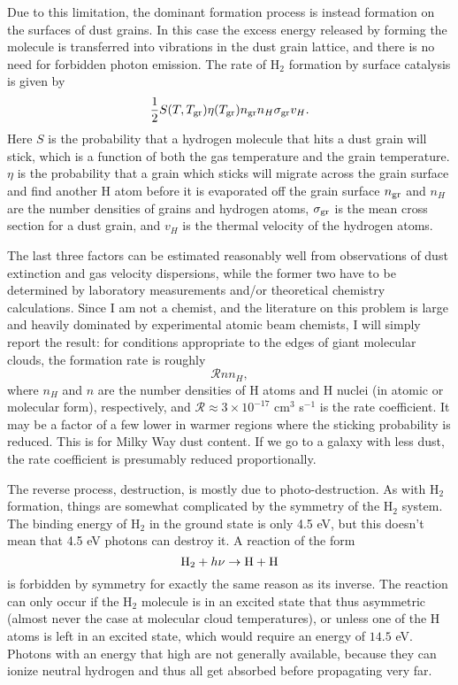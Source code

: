 Due to this limitation, the dominant formation process is instead formation on the surfaces of dust grains. In this case the excess energy released by forming the molecule is transferred into vibrations in the dust grain lattice, and there is no need for forbidden photon emission. The rate of H$_2$ formation by surface catalysis is given by
\begin{equation}
\frac{1}{2} S(T,T_{\rm gr}) \eta(T_{\rm gr}) n_{\rm gr} n_H \sigma_{\rm gr} v_H.
\end{equation}
Here $S$ is the probability that a hydrogen molecule that hits a dust grain will stick, which is a function of both the gas temperature and the grain temperature. $\eta$ is the probability that a grain which sticks will migrate across the grain surface and find another H atom before it is evaporated off the grain surface $n_{\rm gr}$ and $n_H$ are the number densities of grains and hydrogen atoms, $\sigma_{\rm gr}$ is the mean cross section for a dust grain, and $v_H$ is the thermal velocity of the hydrogen atoms.

The last three factors can be estimated reasonably well from observations of dust extinction and gas velocity dispersions, while the former two have to be determined by laboratory measurements and/or theoretical chemistry calculations. Since I am not a chemist, and the literature on this problem is large and heavily dominated by experimental atomic beam chemists, I will simply report the result: for conditions appropriate to the edges of giant molecular clouds, the formation rate is roughly
\begin{equation}
\mathcal{R} n n_H,
\end{equation}
where $n_H$ and $n$ are the number densities of H atoms and H nuclei (in atomic or molecular form), respectively, and $\mathcal{R}\approx 3\times 10^{-17}$ cm$^3$ s$^{-1}$ is the rate coefficient. It may be a factor of a few lower in warmer regions where the sticking probability is reduced. This is for Milky Way dust content. If we go to a galaxy with less dust, the rate coefficient is presumably reduced proportionally.

The reverse process, destruction, is mostly due to photo-destruction. As with H$_2$ formation, things are somewhat complicated by the symmetry of the H$_2$ system. The binding energy of H$_2$ in the ground state is only 4.5 eV, but this doesn't mean that 4.5 eV photons can destroy it. A reaction of the form
\begin{equation}
{\rm H_2} + h\nu \rightarrow {\rm H}+{\rm H}
\end{equation}
is forbidden by symmetry for exactly the same reason as its inverse. The reaction can only occur if the H$_2$ molecule is in an excited state that thus asymmetric (almost never the case at molecular cloud temperatures), or unless one of the H atoms is left in an excited state, which would require an energy of $14.5$ eV. Photons with an energy that high are not generally available, because they can ionize neutral hydrogen and thus all get absorbed before propagating very far.

